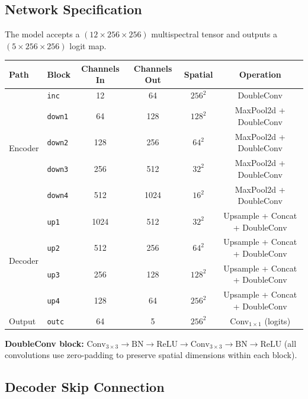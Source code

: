 \documentclass[12pt, a4paper]{article}
\begin{document}
\subsection{Network Specification}

The model accepts a $(12 \times 256 \times 256)$ multispectral tensor and outputs a $(5 \times 256 \times 256)$ logit map.

\begin{center}
\renewcommand{\arraystretch}{1.25}
\begin{tabular}{llcccc}
\toprule
\textbf{Path} & \textbf{Block} & \textbf{Channels In} & \textbf{Channels Out} & \textbf{Spatial} & \textbf{Operation} \\
\midrule
\multirow{5}{*}{Encoder}
  & \texttt{inc}   & 12   & 64   & $256^2$ & DoubleConv \\
  & \texttt{down1} & 64   & 128  & $128^2$ & MaxPool2d + DoubleConv \\
  & \texttt{down2} & 128  & 256  & $64^2$  & MaxPool2d + DoubleConv \\
  & \texttt{down3} & 256  & 512  & $32^2$  & MaxPool2d + DoubleConv \\
  & \texttt{down4} & 512  & 1024 & $16^2$  & MaxPool2d + DoubleConv \\
\midrule
\multirow{4}{*}{Decoder}
  & \texttt{up1}   & 1024 & 512 & $32^2$  & Upsample + Concat + DoubleConv \\
  & \texttt{up2}   & 512  & 256 & $64^2$  & Upsample + Concat + DoubleConv \\
  & \texttt{up3}   & 256  & 128 & $128^2$ & Upsample + Concat + DoubleConv \\
  & \texttt{up4}   & 128  & 64  & $256^2$ & Upsample + Concat + DoubleConv \\
\midrule
Output & \texttt{outc} & 64 & 5 & $256^2$ & Conv$_{1\times1}$ (logits) \\
\bottomrule
\end{tabular}
\end{center}

\textbf{DoubleConv block:}
$\text{Conv}_{3\times3} \!\to\! \text{BN} \!\to\! \text{ReLU} \!\to\! \text{Conv}_{3\times3} \!\to\! \text{BN} \!\to\! \text{ReLU}$
(all convolutions use zero-padding to preserve spatial dimensions within each block).

\subsection{Decoder Skip Connection}
\end{document}
